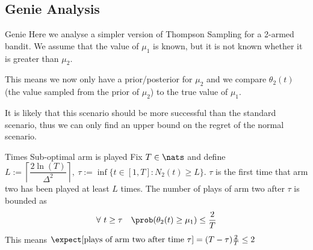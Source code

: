 \documentclass[11pt,a4paper]{article}
\begin{document}
\subsection{Genie Analysis}

  \begin{remark}{Genie}
    Here we analyse a simpler version of Thompson Sampling for a 2-armed bandit. We assume that the value of $\mu_1$ is known, but it is not known whether it is greater than $\mu_2$.
    \par This means we now only have a prior/posterior for $\mu_2$ and we compare $\theta_2(t)$ (the value sampled from the prior of $\mu_2$) to the true value of $\mu_1$.
    \par It is likely that this scenario should be more successful than the standard scenario, thus we can only find an upper bound on the regret of the normal scenario.
  \end{remark}

  \begin{theorem}{Times Sub-optimal arm is played}
    Fix $T\in\nats$ and define $L:=\left\lceil\dfrac{2\ln(T)}{\Delta^2}\right\rceil,\ \tau:=\inf\{t\in[1,T]:N_2(t)\geq L\}$.
    $\tau$ is the first time that arm two has been played at least $L$ times. The number of plays of arm two after $\tau$ is bounded as
    \[ \forall\ t\geq\tau\quad \prob(\theta_2(t)\geq\mu_1)\leq\frac2T \]
    This means $\expect[\text{plays of arm two after time }\tau]=(T-\tau)\frac{2}T\leq2$
  \end{theorem}
\end{document}
